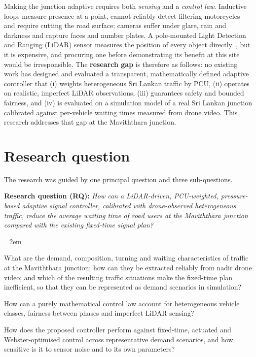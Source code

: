 Making the junction adaptive requires both \emph{sensing} and a \emph{control law}. Inductive loops measure presence at a point, cannot reliably detect filtering motorcycles and require cutting the road surface; cameras suffer under glare, rain and darkness and capture faces and number plates. A pole-mounted Light Detection and Ranging (LiDAR) sensor measures the position of every object directly~\cite{zhao2019lidar,lv2019lidar}, but it is expensive, and procuring one before demonstrating its benefit at this site would be irresponsible. The \textbf{research gap} is therefore as follows: no existing work has designed and evaluated a transparent, mathematically defined adaptive controller that (i) weights heterogeneous Sri Lankan traffic by PCU, (ii) operates on realistic, imperfect LiDAR observations, (iii) guarantees safety and bounded fairness, and (iv) is evaluated on a simulation model of a real Sri Lankan junction calibrated against per-vehicle waiting times measured from drone video. This research addresses that gap at the Maviththara junction.

\section{Research question}\label{sec:intro-rq}

The research was guided by one principal question and three sub-questions.

\textbf{Research question (RQ):} \emph{How can a LiDAR-driven, PCU-weighted, pressure-based adaptive signal controller, calibrated with drone-observed heterogeneous traffic, reduce the average waiting time of road users at the Maviththara junction compared with the existing fixed-time signal plan?}

{\emergencystretch=2em\begin{description}[leftmargin=1.7cm, labelwidth=1.3cm, labelsep=0.4cm, itemsep=2pt]
  \item[SRQ1] What are the demand, composition, turning and waiting characteristics of traffic at the Maviththara junction; how can they be extracted reliably from nadir drone video; and which of the resulting traffic situations make the fixed-time plan inefficient, so that they can be represented as demand scenarios in simulation?
  \item[SRQ2] How can a purely mathematical control law account for heterogeneous vehicle classes, fairness between phases and imperfect LiDAR sensing?
  \item[SRQ3] How does the proposed controller perform against fixed-time, actuated and Webster-optimised control across representative demand scenarios, and how sensitive is it to sensor noise and to its own parameters?
\end{description}}

